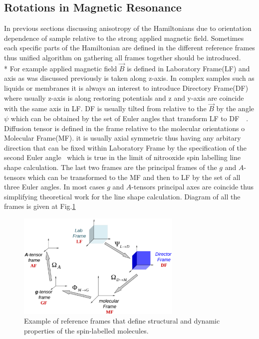 \subsection{Rotations in Magnetic Resonance}\label{torationsection}
In previous sections discussing anisotropy of the Hamiltonians due to orientation dependence of sample relative to the strong applied magnetic field. Sometimes each specific parts of the Hamiltonian are defined in the different reference frames thus unified algorithm on gathering all frames together should be introduced.\\*  
For example applied magnetic field $\vec{B}$ is defined in Laboratory Frame(LF) and axis as was discussed previously is taken along z-axis. In complex samples such as liquids or membranes it is always an interest to introduce Directory Frame(DF) where usually z-axis is along restoring potentials and z and y-axis are coincide with the same axis in LF. DF is usually tilted from relative to the $\vec{B}$ by the angle $\psi$ which can be obtained by the set of Euler angles that transform LF to DF~\cite{rotat}~\cite{bmr}. Diffusion tensor is defined in the frame relative to the molecular orientations o Molecular Frame(MF). it is usually axial symmetric thus having any arbitary direction that can be fixed within Laboratory Frame by the specification of the second Euler angle~\cite{bmr} which is true in the limit of nitrooxide spin labelling line shape calculation. The last two frames are the principal frames of the $g$ and $A$-tensors which can be transformed to the MF and then to LF by the set of all three Euler angles. In most cases $g$ and $A$-tensors principal axes are coincide thus simplifying theoretical work for the line shape calculation. Diagram of all the frames is given at Fig.\ref{figure:rotat}
\begin{figure}[h]
\centering
\includegraphics[width=0.7\textwidth]{figures/chap1/frames.eps}
\caption{Example of reference frames that define structural and dynamic properties of the spin-labelled molecules.~\cite{rotat}}
\label{figure:rotat}
\end{figure}
